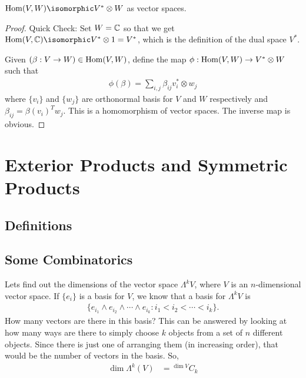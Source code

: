 \begin{theorem}[]
    $\Hom(V,W) \isomorphic V^*\otimes W$ as vector spaces.
\end{theorem}
\begin{proof}
   Quick Check: Set $W=\mathbb{C}$ so that we get $\Hom(V,\CC)\isomorphic V^*\otimes 1 = V^*$, which is the definition of the dual space $V^*$.

   Given $(\beta: V\to W) \in \operatorname{Hom}(V,W)$, define the map $\phi: \operatorname{Hom}(V,W)\to V^* \otimes W $ such that 
   \begin{align}
       \phi(\beta) = \sum_{i,j} \beta_{ij} v_i^* \otimes w_j
   \end{align}
   where $\{v_i\}$ and $\{w_j\}$ are orthonormal basis for $V$ and $W$ respectively and $\beta_{ij} = \beta(v_i)^T w_j$.
   This is a homomorphism of vector spaces. The inverse map is obvious.
\end{proof}

\section{Exterior Products and Symmetric Products}
\label{sec:exterior_products_and_symmetric_products}

\subsection{Definitions}
\label{sub:definitions}

\subsection{Some Combinatorics}
\label{sub:some_combinatorics}

Lets find out the dimensions of the vector space $\Lambda^k V$, where $V$ is an $n$-dimensional vector space.
If $\{e_i\}$ is a basis for $V$, we know that a basis for $\Lambda^k V$ is 
\begin{align}
    \{e_{i_1}\wedge e_{i_2} \wedge\cdots \wedge e_{i_k} : i_1 < i_2 < \cdots < i_k \}.
\end{align}
How many vectors are there in this basis? This can be answered by looking at how many ways are there to simply choose $k$ objects from a set of $n$ different objects. Since there is just one of arranging them (in increasing order), that would be the number of vectors in the basis. So,
\begin{align}
    \dim \Lambda^k (V) &= {}^{\dim V}C_k
    \label{eqn:dim_exteriorpower}
\end{align}

